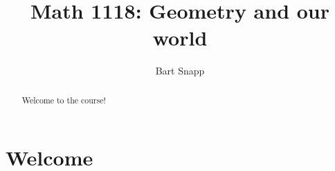 \documentclass{xourse}
\title{Math 1118: Geometry and our world}
\author{Bart Snapp}
\begin{document}
\begin{abstract}
Welcome to the course!
\end{abstract}
\maketitle

\part{Welcome}

\end{document}
